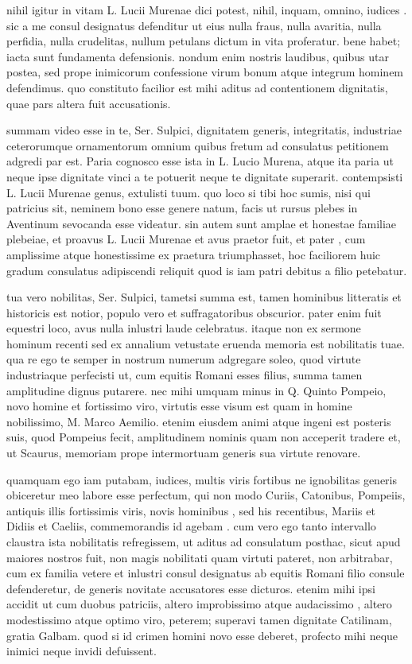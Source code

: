  nihil igitur in vitam L. Lucii Murenae dici potest, nihil, inquam, omnino, iudices . sic a me consul designatus defenditur ut eius nulla fraus, nulla avaritia, nulla perfidia, nulla crudelitas, nullum petulans dictum in vita proferatur. bene habet; iacta sunt fundamenta defensionis. nondum enim nostris laudibus, quibus utar postea, sed prope inimicorum confessione virum bonum atque integrum hominem defendimus. quo constituto facilior est mihi aditus ad contentionem dignitatis, quae pars altera fuit accusationis.

 summam video esse in te, Ser. Sulpici, dignitatem generis, integritatis, industriae ceterorumque ornamentorum omnium quibus fretum ad consulatus petitionem adgredi par est. Paria cognosco esse ista in L. Lucio Murena, atque ita paria ut neque ipse dignitate vinci a te potuerit neque te dignitate superarit. contempsisti L. Lucii Murenae genus, extulisti tuum. quo loco si tibi hoc sumis, nisi qui patricius sit, neminem bono esse genere natum, facis ut rursus plebes in Aventinum sevocanda esse videatur. sin autem sunt amplae et honestae familiae plebeiae, et proavus L. Lucii Murenae et avus praetor fuit, et pater , cum amplissime atque honestissime ex praetura triumphasset, hoc faciliorem huic gradum consulatus adipiscendi reliquit quod is iam patri debitus a filio petebatur.

 tua vero nobilitas, Ser. Sulpici, tametsi summa est, tamen hominibus litteratis et historicis est notior, populo vero et suffragatoribus obscurior. pater enim fuit equestri loco, avus nulla inlustri laude celebratus. itaque non ex sermone hominum recenti sed ex annalium vetustate eruenda memoria est nobilitatis tuae. qua re ego te semper in nostrum numerum adgregare soleo, quod virtute industriaque perfecisti ut, cum equitis Romani esses filius, summa tamen amplitudine dignus putarere. nec mihi umquam minus in Q. Quinto Pompeio, novo homine et fortissimo viro, virtutis esse visum est quam in homine nobilissimo, M. Marco Aemilio. etenim eiusdem animi atque ingeni est posteris suis, quod Pompeius fecit, amplitudinem nominis quam non acceperit tradere et, ut Scaurus, memoriam prope intermortuam generis sua virtute renovare.

 quamquam ego iam putabam, iudices, multis viris fortibus ne ignobilitas generis obiceretur meo labore esse perfectum, qui non modo Curiis, Catonibus, Pompeiis, antiquis illis fortissimis viris, novis hominibus , sed his recentibus, Mariis et Didiis et Caeliis, commemorandis id agebam . cum vero ego tanto intervallo claustra ista nobilitatis refregissem, ut aditus ad consulatum posthac, sicut apud maiores nostros fuit, non magis nobilitati quam virtuti pateret, non arbitrabar, cum ex familia vetere et inlustri consul designatus ab equitis Romani filio consule defenderetur, de generis novitate accusatores esse dicturos. etenim mihi ipsi accidit ut cum duobus patriciis, altero improbissimo atque audacissimo , altero modestissimo atque optimo viro, peterem; superavi tamen dignitate Catilinam, gratia Galbam. quod si id crimen homini novo esse deberet, profecto mihi neque inimici neque invidi defuissent.

